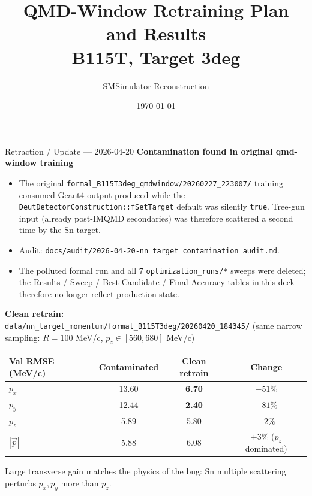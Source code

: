 \documentclass[11pt]{beamer}
\title{QMD-Window Retraining Plan and Results\\B115T, Target 3deg}
\author{SMSimulator Reconstruction}
\date{\today}
\begin{document}
\begin{frame}
\titlepage
\end{frame}

\begin{frame}{Retraction / Update --- 2026-04-20}
\textbf{Contamination found in original qmd-window training}
\begin{itemize}
\item The original \texttt{formal\_B115T3deg\_qmdwindow/20260227\_223007/}
training consumed Geant4 output produced while the
\texttt{DeutDetectorConstruction::fSetTarget} default was silently
\texttt{true}. Tree-gun input (already post-IMQMD secondaries) was
therefore scattered a second time by the Sn target.
\item Audit: \texttt{docs/audit/2026-04-20-nn\_target\_contamination\_audit.md}.
\item The polluted formal run and all 7 \texttt{optimization\_runs/*}
sweeps were deleted; the Results / Sweep / Best-Candidate /
Final-Accuracy tables in this deck therefore no longer reflect
production state.
\end{itemize}

\textbf{Clean retrain:} \texttt{data/nn\_target\_momentum/formal\_B115T3deg/20260420\_184345/}
(same narrow sampling: \(R=100\) MeV/c, \(p_z\in[560,680]\) MeV/c)
\begin{table}
\centering
\small
\begin{tabular}{lccc}
\toprule
Val RMSE (MeV/c) & Contaminated & Clean retrain & Change \\
\midrule
\(p_x\) & 13.60 & \textbf{6.70} & \(-51\%\) \\
\(p_y\) & 12.44 & \textbf{2.40} & \(-81\%\) \\
\(p_z\) & 5.89 & 5.80 & \(-2\%\) \\
\(|\vec p|\) & 5.88 & 6.08 & \(+3\%\) (\(p_z\) dominated) \\
\bottomrule
\end{tabular}
\end{table}
Large transverse gain matches the physics of the bug: Sn multiple
scattering perturbs \(p_x,p_y\) more than \(p_z\).
\end{frame}
\end{document}
